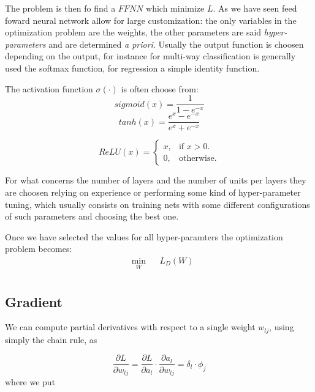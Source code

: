The problem is then fo find a $FFNN$ which minimize $L$. As we have seen feed foward neural network allow for large customization: the only variables in the optimization problem are the weights, the other
parameters are said \textit{hyper-parameters} and are determined \textit{a priori}. Usually the output function is choosen depending on the output, for instance for multi-way classification
is generally used the softmax function, for regression a simple identity function.

The activation function $\sigma(\cdot)$ is often choose from:
\begin{equation}
 sigmoid(x)=\frac{1}{1-e^{-x}}
\end{equation}
\begin{equation}
 tanh(x)=\frac{e^x-e^{-x}}{e^x+e^{-x}}
\end{equation}

\begin{equation}
  ReLU(x)=\begin{cases}
    x, & \text{if $x>0$}.\\
    0, & \text{otherwise}.
  \end{cases}
\end{equation}

For what concerns the number of layers and the number of units per layers they are choosen relying on experience or performing some kind of hyper-parameter tuning, which usually consists on training nets
with some different configurations of such parameters and choosing the best one.

Once we have selected the values for all hyper-paramters the optimization problem becomes:
\begin{equation}
\begin{aligned}
& \underset{W}{\text{min}}
& & L_D(W) \\
\end{aligned}
\end{equation}






\subsection{Gradient}

We can compute partial derivatives with respect to a single weight $w_{lj}$, using simply the chain rule, as 

$$\frac{\partial L}{\partial w_{lj}}=\frac{\partial L}{\partial a_l} \cdot \frac{\partial a_l}{\partial w_{lj}}=\delta_l \cdot \phi_j$$
where we put


